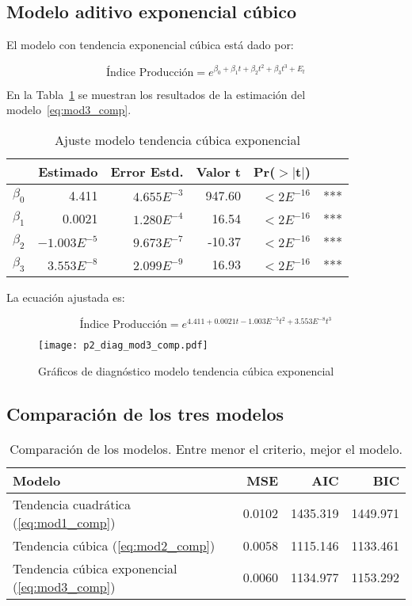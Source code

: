 \documentclass{tufte-handout}
\begin{document}
\subsection*{Modelo aditivo exponencial cúbico}

El modelo con tendencia exponencial cúbica está dado por:

\begin{equation} \label{eq:mod3_comp}
	\text{Índice Producción} = e^{\beta_0 + \beta_1 t + \beta_2 t^2 + \beta_3 t^3 + E_t}
\end{equation}

En la Tabla~\ref{tab:mod3_comp} se muestran los resultados de la estimación del modelo~\ref{eq:mod3_comp}.

\begin{table}[ht]
\centering
\begin{tabular}{lrrrrl}
          & Estimado & Error Estd. & Valor t & Pr($>$$|$t$|$) & \\ 
  \hline
$\beta_0$ & 4.411 & $4.655E^{-3}$ & 947.60 & $<2E^{-16}$ & *** \\ 
  $\beta_1$ & 0.0021 & $1.280E^{-4}$ & 16.54 & $<2E^{-16}$ & *** \\ 
  $\beta_2$ & $-1.003E^{-5}$ & $9.673E^{-7}$ & -10.37 & $<2E^{-16}$ & *** \\ 
  $\beta_3$ & $3.553E^{-8}$ & $2.099E^{-9}$ & 16.93 & $<2E^{-16}$ & *** \\ 
   \hline
\end{tabular}
\caption{Ajuste modelo tendencia cúbica exponencial} 
\label{tab:mod3_comp}
\end{table}

La ecuación ajustada es:

\begin{equation}
	\text{Índice Producción} = e^{4.411 + 0.0021 t - 1.003E^{-5} t^2 + 3.553E^{-8} t^3}
\end{equation}

\begin{figure*}[!ht]
    \texttt{[image: p2\_diag\_mod3\_comp.pdf]}
    \caption{Gráficos de diagnóstico modelo tendencia cúbica exponencial}
    \label{fig:p2_diag_mod3_comp.pdf}
\end{figure*}

\subsection*{Comparación de los tres modelos}

\begin{table}[ht]
\centering
\begin{tabular}{lrrr}
  Modelo     & MSE & AIC & BIC \\ 
  \hline
Tendencia cuadrática (\ref{eq:mod1_comp}) & 0.0102 & 1435.319 & 1449.971 \\ 
Tendencia cúbica (\ref{eq:mod2_comp}) & 0.0058 & 1115.146 & 1133.461 \\ 
Tendencia cúbica exponencial (\ref{eq:mod3_comp}) & 0.0060 & 1134.977 & 1153.292 \\ 
   \hline
\end{tabular}
\caption{Comparación de los modelos. Entre menor el criterio, mejor el modelo.} 
\label{tab:comparacion_modelos}
\end{table}
\end{document}
